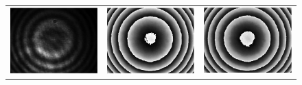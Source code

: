 \documentclass[letterpaper,12pt]{article}   %
\begin{document}
\begin{figure}[h t]
	\begin{center}
		\begin{tabular}{c c c}
			\includegraphics[scale=0.25]{figures/InterferogramaExpMod.png}}&
			\includegraphics[scale=0.25]{figures/faseExpRST.png}}&
			\includegraphics[scale=0.25]{figures/faseExpAIA.png}}& \\

\end{tabular}
\end{center}
\end{figure}
\end{document}
